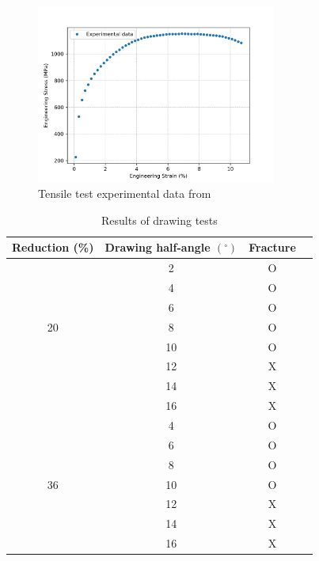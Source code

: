 \documentclass[sn-mathphys,Numbered,draft]{sn-jnl}%
\begin{document}
\begin{figure}[htb]
\begin{center}
	\includegraphics[width=0.7\textwidth]{./Figures/SimulationAndAnalysis/compareExperimentalSimulation/experimentalData.png}
\caption{Tensile test experimental data from \cite{roh_process_2021}}
\label{fig:notchedRoundBAr}
\end{center}
\end{figure}

\begin{table}[htb]
	\centering
		\begin{tabular}{cccc} \hline
			Reduction (\%) & Drawing half-angle $(^{\circ})$ & Fracture  \\ \hline 
             & 2 & O \\
			 & 4 & O \\
   		 & 6 & O \\
      	20 & 8 & O \\
             & 10 & O \\
             & 12 & X \\
             & 14 & X \\
             & 16 & X \\
			\hline
			 & 4 & O \\
   		 & 6 & O \\
      	 & 8 & O \\
           36  & 10 & O \\
             & 12 & X \\
             & 14 & X \\
             & 16 & X \\
			\hline
		\end{tabular}
	\caption{Results of drawing tests \cite{roh_process_2021}}
	\label{tab:material_properties}
\end{table}
\end{document}
